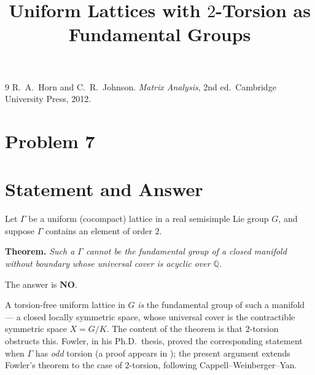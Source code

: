\documentclass[11pt]{article}
\begin{document}
\begin{thebibliography}{9}
 R.~A.~Horn and C.~R.~Johnson.
  \emph{Matrix Analysis}, 2nd ed.\ Cambridge University Press, 2012.
\end{thebibliography}

\endgroup

\clearpage
\section*{Problem 7}
\begingroup
\hypersetup{colorlinks=true,
            linkcolor=blue!50!black,
            citecolor=blue!50!black,
            urlcolor=blue!50!black}
\newcommand{\qsevenR}{\mathbb{R}}
\newcommand{\qsevenQ}{\mathbb{Q}}
\newcommand{\qsevenZ}{\mathbb{Z}}
\newcommand{\qsevenLgp}{\mathbb{L}}
\newcommand{\qsevensign}{\operatorname{sign}}
\newcommand{\qsevencd}{\operatorname{cd}}
\newcommand{\qseventM}{\widetilde M}
\newcommand{\qsevenim}{\operatorname{im}}
\newtheorem{qseventheorem}{Theorem}
\newtheorem{qsevenlemma}{Lemma}
\newtheorem{qsevenproposition}{Proposition}
\title{Uniform Lattices with $2$-Torsion as Fundamental Groups}
\author{}
\date{}
\maketitle


\section*{Statement and Answer}

Let $\Gamma$ be a uniform (cocompact) lattice in a real semisimple Lie group
$G$, and suppose $\Gamma$ contains an element of order $2$.

\medskip
\noindent\textbf{Theorem.} \emph{Such a $\Gamma$ cannot be the fundamental group
of a closed manifold without boundary whose universal cover is acyclic over
$\qsevenQ$.}

\medskip
\noindent The answer is \textbf{NO}.

\medskip
A torsion-free uniform lattice in $G$ \emph{is} the fundamental group of such a
manifold --- a closed locally symmetric space, whose universal cover is the
contractible symmetric space $X=G/K$. The content of the theorem is that
$2$-torsion obstructs this. Fowler, in his Ph.D.\ thesis, proved the
corresponding statement when $\Gamma$ has \emph{odd} torsion (a proof appears in
\cite{W2}); the present argument extends Fowler's theorem to the case of
$2$-torsion, following Cappell--Weinberger--Yan.
\end{document}
